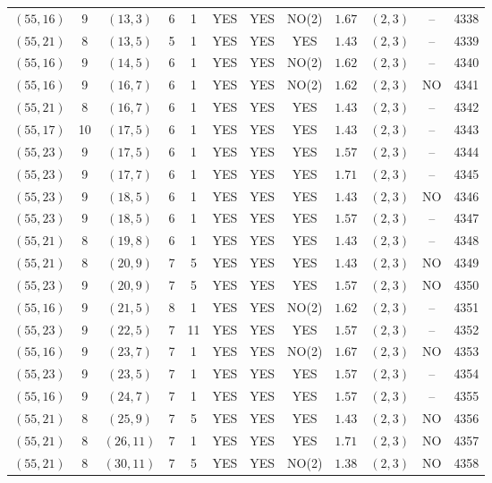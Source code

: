 \begin{longtable}{|c|c|c|c|c|c|c|c|c|c|c|c|}
$(55,16)$ & 9 & $(13,3)$ & 6 & 1 & YES & YES & NO(2) & $1.67$ & $(2,3)$ & -- & 4338\\
$(55,21)$ & 8 & $(13,5)$ & 5 & 1 & YES & YES & YES & $1.43$ & $(2,3)$ & -- & 4339\\
$(55,16)$ & 9 & $(14,5)$ & 6 & 1 & YES & YES & NO(2) & $1.62$ & $(2,3)$ & -- & 4340\\
$(55,16)$ & 9 & $(16,7)$ & 6 & 1 & YES & YES & NO(2) & $1.62$ & $(2,3)$ & NO & 4341\\
$(55,21)$ & 8 & $(16,7)$ & 6 & 1 & YES & YES & YES & $1.43$ & $(2,3)$ & -- & 4342\\
$(55,17)$ & 10 & $(17,5)$ & 6 & 1 & YES & YES & YES & $1.43$ & $(2,3)$ & -- & 4343\\
$(55,23)$ & 9 & $(17,5)$ & 6 & 1 & YES & YES & YES & $1.57$ & $(2,3)$ & -- & 4344\\
$(55,23)$ & 9 & $(17,7)$ & 6 & 1 & YES & YES & YES & $1.71$ & $(2,3)$ & -- & 4345\\
$(55,23)$ & 9 & $(18,5)$ & 6 & 1 & YES & YES & YES & $1.43$ & $(2,3)$ & NO & 4346\\
$(55,23)$ & 9 & $(18,5)$ & 6 & 1 & YES & YES & YES & $1.57$ & $(2,3)$ & -- & 4347\\
$(55,21)$ & 8 & $(19,8)$ & 6 & 1 & YES & YES & YES & $1.43$ & $(2,3)$ & -- & 4348\\
$(55,21)$ & 8 & $(20,9)$ & 7 & 5 & YES & YES & YES & $1.43$ & $(2,3)$ & NO & 4349\\
$(55,23)$ & 9 & $(20,9)$ & 7 & 5 & YES & YES & YES & $1.57$ & $(2,3)$ & NO & 4350\\
$(55,16)$ & 9 & $(21,5)$ & 8 & 1 & YES & YES & NO(2) & $1.62$ & $(2,3)$ & -- & 4351\\
$(55,23)$ & 9 & $(22,5)$ & 7 & 11 & YES & YES & YES & $1.57$ & $(2,3)$ & -- & 4352\\
$(55,16)$ & 9 & $(23,7)$ & 7 & 1 & YES & YES & NO(2) & $1.67$ & $(2,3)$ & NO & 4353\\
$(55,23)$ & 9 & $(23,5)$ & 7 & 1 & YES & YES & YES & $1.57$ & $(2,3)$ & -- & 4354\\
$(55,16)$ & 9 & $(24,7)$ & 7 & 1 & YES & YES & YES & $1.57$ & $(2,3)$ & -- & 4355\\
$(55,21)$ & 8 & $(25,9)$ & 7 & 5 & YES & YES & YES & $1.43$ & $(2,3)$ & NO & 4356\\
$(55,21)$ & 8 & $(26,11)$ & 7 & 1 & YES & YES & YES & $1.71$ & $(2,3)$ & NO & 4357\\
$(55,21)$ & 8 & $(30,11)$ & 7 & 5 & YES & YES & NO(2) & $1.38$ & $(2,3)$ & NO & 4358\\

\end{longtable}
